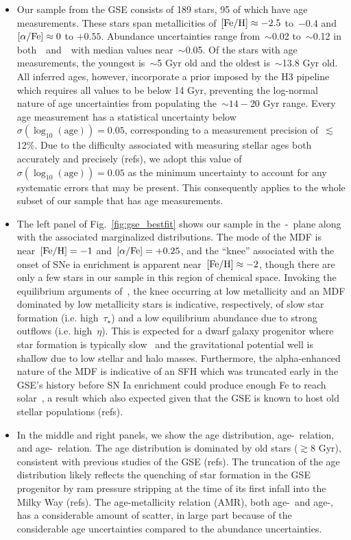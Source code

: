 \documentclass[ms.tex]{subfiles}
\begin{document}
\begin{itemize}

	\item Our sample from the GSE consists of 189 stars, 95 of which have
	age measurements.
	These stars span metallicities of~$\text{[Fe/H]} \approx -2.5$ to~$-0.4$ and
	$\text{[$\alpha$/Fe]} \approx 0$ to $+0.55$.
	Abundance uncertainties range from~$\sim$0.02 to~$\sim$0.12 in
	both~\feh~and~\afe~with median values near~$\sim$0.05.
	Of the stars with age measurements, the youngest is~$\sim$5 Gyr old and the
	oldest is~$\sim$13.8 Gyr old.
	All inferred ages, however, incorporate a prior imposed by the H3 pipeline
	which requires all values to be below 14 Gyr, preventing the log-normal
	nature of age uncertainties from populating the~$\sim14 - 20$ Gyr range.
	Every age measurement has a statistical uncertainty below
	$\sigma(\log_{10}(\text{age})) = 0.05$, corresponding to a measurement
	precision of~$\lesssim$12\%.
	Due to the difficulty associated with measuring stellar ages both
	accurately and precisely (refs), we adopt this value of
	$\sigma(\log_{10}(\text{age})) = 0.05$ as the minimum uncertainty to
	account for any systematic errors that may be present.
	This consequently applies to the whole subset of our sample that has age
	measurements.

	\item The left panel of Fig.~\ref{fig:gse_bestfit} shows our sample in
	the~\afe-\feh~plane along with the associated marginalized distributions.
	The mode of the MDF is near~$\text{[Fe/H]} = -1$ and~$\text{[$\alpha$/Fe]} = +0.25$, and the
	``knee'' associated with the onset of SNe ia enrichment is apparent
	near~$\text{[Fe/H]} \approx -2$, though there are only a few stars in our sample
	in this region of chemical space.
	Invoking the equilibrium arguments of~\citet{Weinberg2017}, the knee
	occurring at low metallicity and an MDF dominated by low metallicity stars
	is indicative, respectively, of slow star formation (i.e. high~$\tau_\star$)
	and a low equilibrium abundance due to strong outflows (i.e. high~$\eta$).
	This is expected for a dwarf galaxy progenitor where star formation is
	typically slow~\citep[e.g.][]{Hudson2015} and the gravitational potential
	well is shallow due to low stellar and halo masses.
	Furthermore, the alpha-enhanced nature of the MDF is indicative of an SFH
	which was truncated early in the GSE's history before SN Ia enrichment
	could produce enough Fe to reach solar~\afe, a result which also expected
	given that the GSE is known to host old stellar populations (refs).

	\item In the middle and right panels, we show the age distribution,
	age-\feh~relation, and age-\afe~relation.
	The age distribution is dominated by old stars ($\gtrsim$8 Gyr), consistent
	with previous studies of the GSE (refs).
	The truncation of the age distribution likely reflects the quenching of
	star formation in the GSE progenitor by ram pressure stripping at the time
	of its first infall into the Milky Way (refs).
	The age-metallicity relation (AMR), both age-\feh~and age-\afe, has a
	considerable amount of scatter, in large part because of the considerable
	age uncertainties compared to the abundance uncertainties.


\end{itemize}
\end{document}
